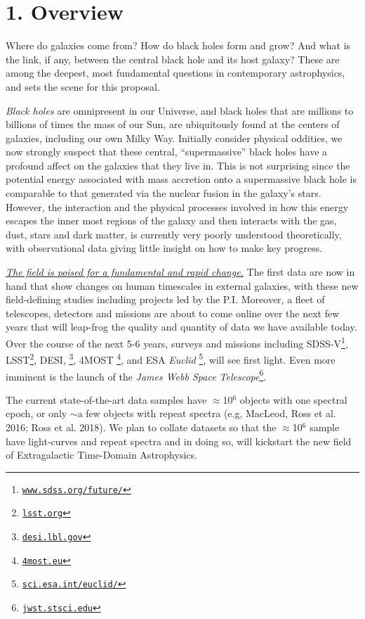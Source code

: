 \documentclass[oneside, a4paper, onecolumn, 11pt]{article}
\begin{document}
\smallskip
\smallskip
\noindent
\section*{\textcolor{Cerulean}{1. Overview}}
\vspace{-8pt}
Where do galaxies come from? How do black holes form and grow? 
And what is the link, if any, between the central black hole 
and its host galaxy?  These are among the
deepest, most fundamental questions in contemporary astrophysics, and
sets the scene for this proposal.

\smallskip
\smallskip
\noindent
{\it Black holes} are omnipresent in our Universe, and black holes
that are millions to billions of times the mass of our Sun, are
ubiquitously found at the centers of galaxies, including our own Milky
Way.  Initially consider physical oddities, we now strongly suspect
that these central, ``supermassive'' black holes have a profound
affect on the galaxies that they live in. This is not surprising since
the potential energy associated with mass accretion onto a
supermassive black hole is comparable to that generated via the
nuclear fusion in the galaxy's stars.
However, the interaction and the physical processes involved in how
this energy escapes the inner most regions of the galaxy and then
interacts with the gas, dust, stars and dark matter, is currently very
poorly understood theoretically, with observational data giving little
insight on how to make key progress.

\smallskip
\smallskip
\noindent
\underline{{\it The field is poised for a fundamental and rapid
change.}} The first data are now in hand that show changes on human
timescales in external galaxies, with these new field-defining studies
including projects led by the P.I.  Moreover, a fleet of telescopes,
detectors and missions are about to come online over the next few
years that will leap-frog the quality and quantity of data we have
available today. Over the course of the next 5-6 years, surveys and
missions including 
SDSS-V\footnote{\href{www.sdss.org/future/}{{\tt www.sdss.org/future/}}}, 
LSST\footnote{\href{lsst.org}{{\tt lsst.org}}}, 
DESI, \footnote{\href{desi.lbl.gov}{{\tt desi.lbl.gov}}}, 
4MOST \footnote{\href{4most.eu}{{\tt 4most.eu}}}, and 
ESA {\it Euclid} \footnote{\href{sci.esa.int/euclid/}{{\tt sci.esa.int/euclid/}}}, 
will
see first light. Even more imminent is the launch of the {\it James
Webb Space Telescope}\footnote{\href{jwst.stsci.edu}{{\tt jwst.stsci.edu}}}.

\smallskip
\smallskip
\noindent
The current state-of-the-art data samples have $\approx$10$^{6}$ objects
with one spectral epoch, or only $\sim$a few objects with repeat
spectra (e.g, MacLeod, Ross et al. 2016; Ross et al. 2018).  
We plan to collate datasets so that the $\approx$10$^{6}$ sample have 
light-curves and repeat spectra and in doing so, will kickstart the new field of
Extragalactic Time-Domain Astrophysics.
\end{document}
